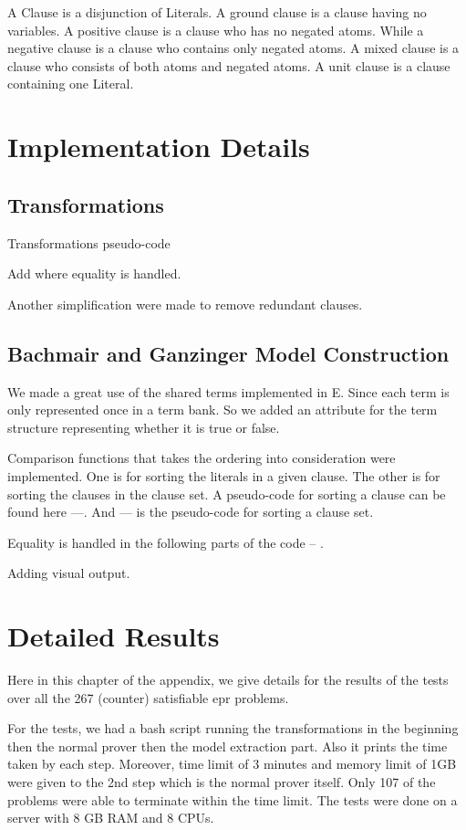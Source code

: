 A Clause is a disjunction of Literals. A ground clause is a clause having no variables. A positive clause is a clause who has no negated atoms. While a negative clause is a clause who contains only negated atoms. A mixed clause is a clause who consists of both atoms and negated atoms. A unit clause is a clause containing one Literal.


\chapter{Implementation Details}\label{chap:appendix_imp}

\section{Transformations}
Transformations pseudo-code


Add where equality is handled.


Another simplification were made to remove redundant clauses.


\section{Bachmair and Ganzinger Model Construction}
We made a great use of the shared terms implemented in E. Since each term is only represented once in a term bank. So we added an attribute for the term structure representing whether it is true or false.


Comparison functions that takes the ordering into consideration were implemented. One is for sorting the literals in a given clause. The other is for sorting the clauses in the clause set. A pseudo-code for sorting a clause can be found here ---. And --- is the pseudo-code for sorting a clause set.


Equality is handled in the following parts of the code -- .


Adding visual output.



\chapter{Detailed Results}\label{chap:appendix_res}


Here in this chapter of the appendix, we give details for the results of the tests over all the 267 (counter) satisfiable \ac{epr} problems.


For the tests, we had a bash script running the transformations in the beginning then the normal prover then the model extraction part. Also it prints the time taken by each step. Moreover, time limit of 3 minutes and memory limit of 1GB were given to the 2nd step which is the normal prover itself. Only 107 of the problems were able to terminate within the time limit. The tests were done on a server with 8 GB RAM and 8 CPUs.



